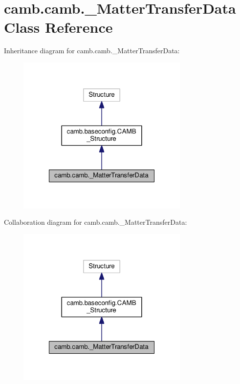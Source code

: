 \hypertarget{classcamb_1_1camb_1_1__MatterTransferData}{}\section{camb.\+camb.\+\_\+\+Matter\+Transfer\+Data Class Reference}
\label{classcamb_1_1camb_1_1__MatterTransferData}


Inheritance diagram for camb.\+camb.\+\_\+\+Matter\+Transfer\+Data\+:
\nopagebreak
\begin{figure}[H]
\begin{center}
\leavevmode
\includegraphics[width=240pt]{classcamb_1_1camb_1_1__MatterTransferData__inherit__graph}
\end{center}
\end{figure}


Collaboration diagram for camb.\+camb.\+\_\+\+Matter\+Transfer\+Data\+:
\nopagebreak
\begin{figure}[H]
\begin{center}
\leavevmode
\includegraphics[width=240pt]{classcamb_1_1camb_1_1__MatterTransferData__coll__graph}
\end{center}
\end{figure}
